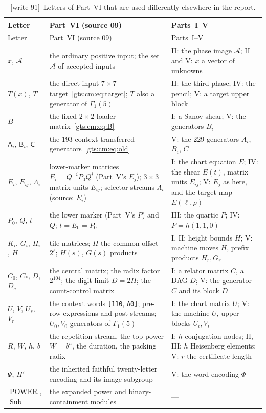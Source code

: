\documentclass[11pt,letterpaper]{article}
\theoremstyle{definition}
\theoremstyle{remark}
\newcommand{\calA}{\mathcal A}
\newcommand{\Pow}{\operatorname{POWER}}
\newcommand{\Sub}{\operatorname{Sub}}
\newcommand{\wtagd}{\textup{[write 91]}}
\begin{document}
\begin{center}
\small
\begin{longtable}{@{}L{.15\textwidth}L{.45\textwidth}L{.32\textwidth}@{}}
\caption{\wtagd\ Letters of Part~VI that are used differently elsewhere in the report.}\label{gts:cm:tab:letters}\\
\toprule
Letter & Part~VI (source 09) & Parts~I--V\\
\midrule
\endfirsthead
\toprule
Letter & Part~VI (source 09) & Parts~I--V\\
\midrule
\endhead
$x$, $\mathcal A$ & the ordinary positive input; the set $\mathcal A$ of accepted inputs & II: the phase image $\calA$; II and V: $x$ a vector of unknowns\\
$T(x)$, $T$ & the direct-input $7\times7$ target~\eqref{gts:cm:eq:target}; $T$ also a generator of $\Gamma_1(5)$ & II: the third phase; IV: the pencil; V: a target upper block\\
$B$ & the fixed $2\times2$ loader matrix~\eqref{gts:cm:eq:B} & I: a Sanov shear; V: the generators $B_i$\\
$\mathsf A_i$, $\mathsf B_i$, $\mathsf C$ & the 193 context-transferred generators~\eqref{gts:cm:eq:old} & V: the 229 generators $A_i$, $B_i$, $C$\\
$E_i$, $E_{ij}$, $\Lambda_i$ & lower-marker matrices $E_i=Q^{-i}P_0Q^i$ (Part~V's $E_j$); $3\times3$ matrix units $E_{ij}$; selector streams $\Lambda_i$ (source: $E_i$) & I: the chart equation $E$; IV: the shear $E(t)$, matrix units $E_{ij}$; V: $E_j$ as here, and the target map $E(\ell,\rho)$\\
$P_0$, $Q$, $t$ & the lower marker (Part~V's $P$) and $Q$; $t=E_0=P_0$ & III: the quartic $P$; IV: $P=h(1,1,0)$\\
$K_i$, $G_i$, $H_i$, $H$ & tile matrices; $H$ the common offset $2^\ell$; $H(s)$, $G(s)$ products & I, II: height bounds $H$; V: machine moves $H$, prefix products $H_r,G_r$\\
$C_0$, $C_*$, $D$, $D_c$ & the central matrix; the radix factor $2^{104}$; the digit limit $D=2H$; the count-control matrix & I: a relator matrix $C$, a DAG $D$; V: the generator $C$ and its block $D$\\
$U$, $V$, $U_s$, $V_r$ & the context words \texttt{[110}, \texttt{A0]}; pre-row expressions and post streams; $U_0,V_0$ generators of $\Gamma_1(5)$ & I: the chart matrix $U$; V: the machine $U$, upper blocks $U_i,V_i$\\
$R$, $W$, $h$, $b$ & the repetition stream, the top power $W=b^h$, the duration, the packing radix & I: $h$ conjugation nodes; II, III: $h$ Heisenberg elements; V: $r$ the certificate length\\
$\Psi$, $H'$ & the inherited faithful twenty-letter encoding and its image subgroup & V: the word encoding $\Phi$\\
$\Pow$, $\Sub$ & the expanded power and binary-containment modules & ---\\
\bottomrule
\end{longtable}
\end{center}
\end{document}
